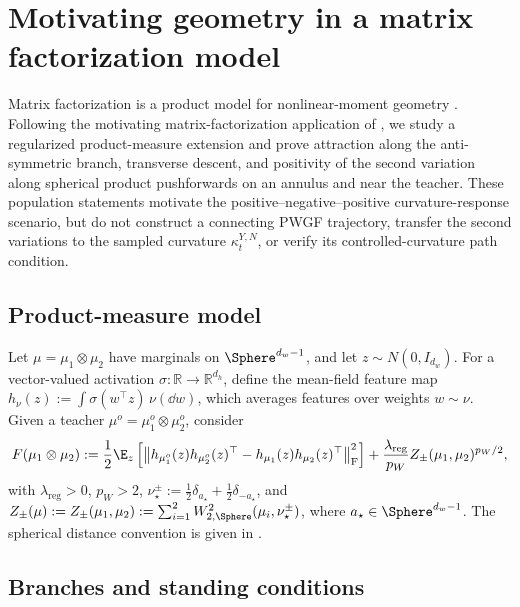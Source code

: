 \section{Motivating geometry in a matrix factorization model}
\label{sec:matrix-factorization}

Matrix factorization is a product model for nonlinear-moment geometry
\citep{kolda2009tensor,sidiropoulos2017tensor,anandkumar2014tensor}.
Following the motivating matrix-factorization application of
\citet{yamamoto2025hessianguided}, we study a regularized product-measure
extension and prove attraction along the anti-symmetric branch, transverse
descent, and positivity of the second variation along spherical product
pushforwards on an annulus and near the teacher. These population statements motivate the
positive--negative--positive curvature-response scenario, but do not construct
a connecting PWGF trajectory, transfer the second variations to the sampled
curvature \(\kappa_t^{Y,N}\), or verify its controlled-curvature path condition.

\subsection{Product-measure model}
\label{subsec:mf-model}

Let \(\mu=\mu_1\otimes\mu_2\) have marginals on \(\Sphere^{d_w-1}\),
and let \(z\sim N(0,I_{d_w})\).
For a vector-valued activation \(\sigma:\mathbb R\to\mathbb R^{d_h}\), define
the mean-field feature map
\(h_\nu(z):=\int\sigma(w^\top z)\,\nu(\dd w)\),
which averages features over weights \(w\sim\nu\).
Given a teacher \(\mu^o=\mu_1^o\otimes\mu_2^o\), consider
\begin{equation}
    F(\mu_1\otimes\mu_2)
    :=
    \frac12\E_z\left[
        \left\|h_{\mu^o_1}(z)h_{\mu^o_2}(z)^\top
        -h_{\mu_1}(z)h_{\mu_2}(z)^\top\right\|_{\mathrm F}^2
    \right]
    +
    \frac{\lambda_{\mathrm{reg}}}{p_W}Z_\pm(\mu_1,\mu_2)^{p_W/2},
    \label{eq:mf-objective}
\end{equation}
with \(\lambda_{\mathrm{reg}}>0\), \(p_W>2\),
\(\nu_\star^\pm:=\tfrac12\delta_{a_\star}+\tfrac12\delta_{-a_\star}\),
and \(Z_\pm(\mu):=Z_\pm(\mu_1,\mu_2):=\sum_{i=1}^2
W_{2,\Sphere}^2(\mu_i,\nu_\star^\pm)\), where
\(a_\star\in\Sphere^{d_w-1}\).
The spherical distance convention is given in
.

\subsection{Branches and standing conditions}
\label{subsec:active-moments}

